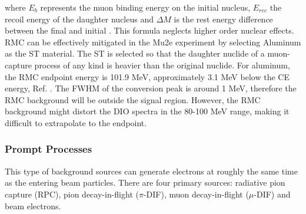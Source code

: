 where $E_b$ represents the muon binding energy on the initial nucleus, $E_{rec}$  
the recoil energy of the daughter nucleus and $\Delta M$ is the rest energy difference 
between the final and initial . This formula neglects higher order nuclear effects. 
RMC can be effectively mitigated in the Mu2e experiment by 
selecting Aluminum as the ST material. The ST is selected so that the daughter nuclide of a muon-capture 
process of any kind is heavier than the original nuclide. For aluminum, the RMC 
endpoint energy is 101.9 MeV, approximately 3.1 MeV below the CE energy, Ref. 
\cite{bartoszek2015mu2e}. 
The  FWHM of the conversion peak is around 1 MeV, therefore the RMC background will be 
outside the signal region. However, the RMC background might distort the DIO spectra 
in the 80-100 MeV 
range, making it difficult to extrapolate to the endpoint.

\subsubsection{Prompt Processes}
This type of background sources can generate electrons at roughly the same time as 
the entering beam particles. There are four primary sources: radiative pion capture (RPC), 
pion decay-in-flight ($\pi$-DIF), muon decay-in-flight ($\mu$-DIF) and beam electrons.

